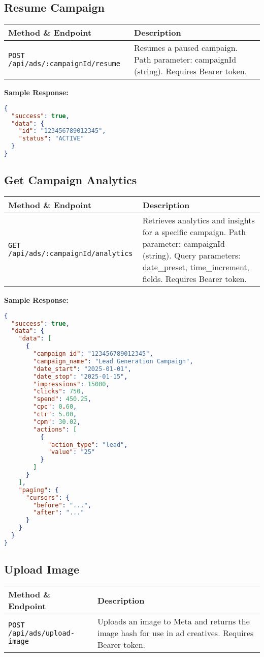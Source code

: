 \documentclass[11pt,a4paper]{article}
\begin{document}
\subsection{Resume Campaign}
\begin{longtable}{L{3cm}Y}
\toprule
\textbf{Method \& Endpoint} & \textbf{Description} \\
\midrule
\texttt{POST /api/ads/:campaignId/resume} & Resumes a paused campaign. Path parameter: campaignId (string). Requires Bearer token. \\
\bottomrule
\end{longtable}

\textbf{Sample Response:}
\begin{lstlisting}[language=json]
{
  "success": true,
  "data": {
    "id": "123456789012345",
    "status": "ACTIVE"
  }
}
\end{lstlisting}

\subsection{Get Campaign Analytics}
\begin{longtable}{L{3cm}Y}
\toprule
\textbf{Method \& Endpoint} & \textbf{Description} \\
\midrule
\texttt{GET /api/ads/:campaignId/analytics} & Retrieves analytics and insights for a specific campaign. Path parameter: campaignId (string). Query parameters: date\_preset, time\_increment, fields. Requires Bearer token. \\
\bottomrule
\end{longtable}

\textbf{Sample Response:}
\begin{lstlisting}[language=json]
{
  "success": true,
  "data": {
    "data": [
      {
        "campaign_id": "123456789012345",
        "campaign_name": "Lead Generation Campaign",
        "date_start": "2025-01-01",
        "date_stop": "2025-01-15",
        "impressions": 15000,
        "clicks": 750,
        "spend": 450.25,
        "cpc": 0.60,
        "ctr": 5.00,
        "cpm": 30.02,
        "actions": [
          {
            "action_type": "lead",
            "value": "25"
          }
        ]
      }
    ],
    "paging": {
      "cursors": {
        "before": "...",
        "after": "..."
      }
    }
  }
}
\end{lstlisting}

\subsection{Upload Image}
\begin{longtable}{L{3cm}Y}
\toprule
\textbf{Method \& Endpoint} & \textbf{Description} \\
\midrule
\texttt{POST /api/ads/upload-image} & Uploads an image to Meta and returns the image hash for use in ad creatives. Requires Bearer token. \\
\bottomrule
\end{longtable}
\end{document}
